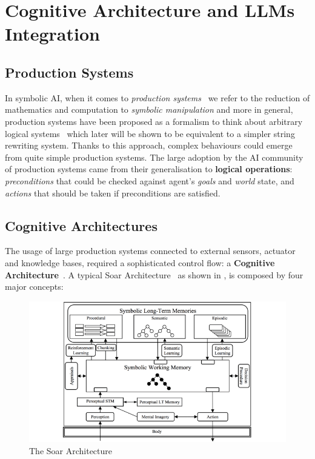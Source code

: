 \section{Cognitive Architecture and LLMs Integration}\label{background}
\subsection{Production Systems}
In symbolic AI, when it comes to \emph{production
systems}~\cite{humanproblemsolving} we refer to the reduction of mathematics and
computation to \emph{symbolic manipulation} and more in general, production
systems have been proposed as a formalism to think about arbitrary logical
systems~\cite{Post1943-POSFRO} which later will be shown to be equivalent to a
simpler string rewriting system. Thanks to this approach, complex behaviours
could emerge from quite simple production systems. The large adoption by the AI
community of production systems came from their generalisation to
\textbf{logical operations}: \emph{preconditions} that could be checked against
agent's \emph{goals} and \emph{world} state, and \emph{actions} that should be
taken if preconditions are satisfied.

\subsection{Cognitive Architectures}
The usage of large production systems connected to external sensors, actuator
and knowledge bases, required a sophisticated control flow: a \textbf{Cognitive
Architecture}~\cite{LANGLEY2009141}. A typical Soar
Architecture~\cite{Newell1990-NEWUTO} as shown in , is composed
by four major concepts:

\begin{figure}[ht]
    \centering
    \includegraphics[width=\textwidth]{img/The-Soar-cognitive-architecture.png}
    \caption{The Soar Architecture}
    \label{fig:soar}
\end{figure}

